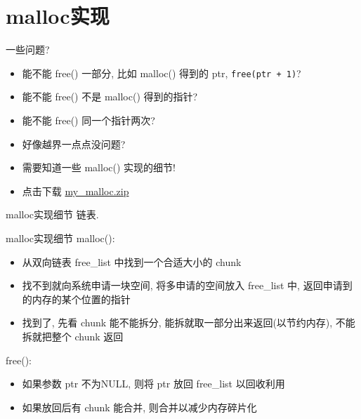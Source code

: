 \section{malloc实现}\label{sec:malloc实现}

\begin{frame}[fragile]{一些问题?}
    \begin{itemize}[<+- | alert@+>]
        \item 能不能 free() 一部分, 比如 malloc() 得到的 ptr, \texttt{free(ptr + 1)}?
        \item 能不能 free() 不是 malloc() 得到的指针?
        \item 能不能 free() 同一个指针两次?
        \item 好像越界一点点没问题?
        \item 需要知道一些 malloc() 实现的细节!
        \item 点击下载 \href{http://problemoverflow.top/download/my\_malloc.zip}{my\_malloc.zip}
    \end{itemize}
\end{frame}

\begin{frame}[fragile]{malloc实现细节}
    链表.
\end{frame}

\begin{frame}[fragile]{malloc实现细节}
    malloc():
    \begin{itemize}[<+- | alert@+>]
        \item 从双向链表 free\_list 中找到一个合适大小的 chunk
        \item 找不到就向系统申请一块空间, 将多申请的空间放入 free\_list 中, 返回申请到的内存的某个位置的指针
        \item 找到了, 先看 chunk 能不能拆分, 能拆就取一部分出来返回(以节约内存), 不能拆就把整个 chunk 返回
    \end{itemize}
    free():
    \begin{itemize}[<+- | alert@+>]
        \item 如果参数 ptr 不为NULL, 则将 ptr 放回 free\_list 以回收利用
        \item 如果放回后有 chunk 能合并, 则合并以减少内存碎片化
    \end{itemize}
\end{frame}

